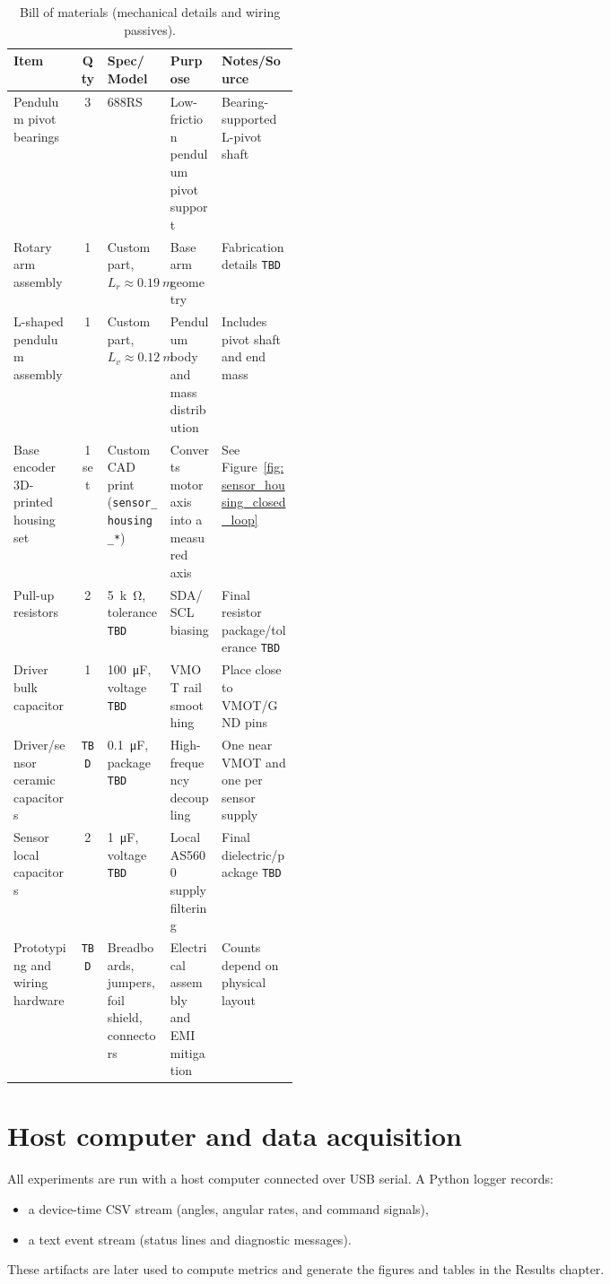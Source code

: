 \begin{table}[htbp]
  \centering
  \small
  \setlength{\tabcolsep}{4pt}
  \caption{Bill of materials (mechanical details and wiring passives).}
  \label{tab:bom_passive}
  \begin{tabularx}{\linewidth}{@{}l c p{0.19\linewidth} p{0.18\linewidth} X@{}}
    \toprule
    Item & Qty & Spec/Model & Purpose & Notes/Source \\
    \midrule
    Pendulum pivot bearings & 3 & 688RS & Low-friction pendulum pivot support & Bearing-supported L-pivot shaft \\
    Rotary arm assembly & 1 & Custom part, $L_r \approx \SI{0.19}{m}$ & Base arm geometry & Fabrication details \texttt{TBD} \\
    L-shaped pendulum assembly & 1 & Custom part, $L_v \approx \SI{0.12}{m}$ & Pendulum body and mass distribution & Includes pivot shaft and end mass \\
    Base encoder 3D-printed housing set & 1 set & Custom CAD print (\texttt{sensor\_housing\_*}) & Converts motor axis into a measured axis & See Figure~\ref{fig:sensor_housing_closed_loop} \\
    Pull-up resistors & 2 & \SI{5}{k\ohm}, tolerance \texttt{TBD} & SDA/SCL biasing & Final resistor package/tolerance \texttt{TBD} \\
    Driver bulk capacitor & 1 & \SI{100}{\micro\farad}, voltage \texttt{TBD} & VMOT rail smoothing & Place close to VMOT/GND pins \\
    Driver/sensor ceramic capacitors & \texttt{TBD} & \SI{0.1}{\micro\farad}, package \texttt{TBD} & High-frequency decoupling & One near VMOT and one per sensor supply \\
    Sensor local capacitors & 2 & \SI{1}{\micro\farad}, voltage \texttt{TBD} & Local AS5600 supply filtering & Final dielectric/package \texttt{TBD} \\
    Prototyping and wiring hardware & \texttt{TBD} & Breadboards, jumpers, foil shield, connectors & Electrical assembly and EMI mitigation & Counts depend on physical layout \\
    \bottomrule
  \end{tabularx}
\end{table}

\section{Host computer and data acquisition}
All experiments are run with a host computer connected over USB serial. A Python logger records:
\begin{itemize}
  \item a device-time CSV stream (angles, angular rates, and command signals),
  \item a text event stream (status lines and diagnostic messages).
\end{itemize}
These artifacts are later used to compute metrics and generate the figures and tables in the Results chapter.

